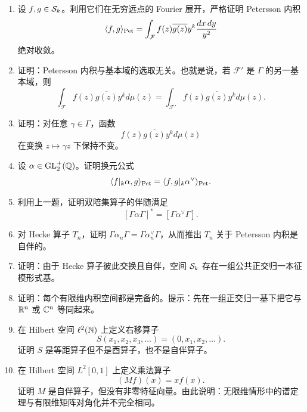 \begin{enumerate}[label=\textbf{5.\arabic*.},start=51]
  \item \hard 设 $f,g\in \mathcal{S}_k$。利用它们在无穷远点的 Fourier 展开，严格证明 Petersson 内积
  \[
  \langle f, g \rangle_{\mathrm{Pet}}=\int_{\mathcal{F}} f(z)\overline{g(z)}y^k\frac{dx\,dy}{y^2}
  \]
  绝对收敛。

  \item \hard 证明：Petersson 内积与基本域的选取无关。也就是说，若 $\mathcal{F}'$ 是 $\Gamma$ 的另一基本域，则
  \[
  \int_{\mathcal{F}} f(z)\overline{g(z)}y^k d\mu(z)
  =
  \int_{\mathcal{F}'} f(z)\overline{g(z)}y^k d\mu(z).
  \]

  \item \hard 证明：对任意 $\gamma\in\Gamma$，函数
  \[
  f(z)\overline{g(z)}y^k d\mu(z)
  \]
  在变换 $z\mapsto \gamma z$ 下保持不变。

  \item \hard 设 $\alpha\in \mathrm{GL}_2^+(\mathbb{Q})$。证明换元公式
  \[
  \langle f|_k\alpha, g \rangle_{\mathrm{Pet}}=\langle f, g|_k\alpha^{\vee} \rangle_{\mathrm{Pet}}.
  \]

  \item \hard 利用上一题，证明双陪集算子的伴随满足
  \[
  [\Gamma\alpha\Gamma]^*=[\Gamma\alpha^{\vee}\Gamma].
  \]

  \item \hard 对 Hecke 算子 $T_n$，证明 $\Gamma\alpha_n\Gamma=\Gamma\alpha_n^{\vee}\Gamma$，从而推出 $T_n$ 关于 Petersson 内积是自伴的。

  \item \hard 证明：由于 Hecke 算子彼此交换且自伴，空间 $\mathcal{S}_k$ 存在一组公共正交归一本征模形式基。

  \item \hard 证明：每个有限维内积空间都是完备的。提示：先在一组正交归一基下把它与 $\mathbb{R}^n$ 或 $\mathbb{C}^n$ 等同起来。

  \item \hard 在 Hilbert 空间 $\ell^2(\mathbb{N})$ 上定义右移算子
  \[
  S(x_1,x_2,x_3,\dots)=(0,x_1,x_2,\dots).
  \]
  证明 $S$ 是等距算子但不是酉算子，也不是自伴算子。

  \item \hard 在 Hilbert 空间 $L^2[0,1]$ 上定义乘法算子
  \[
  (Mf)(x)=xf(x).
  \]
  证明 $M$ 是自伴算子，但没有非零特征向量。由此说明：无限维情形中的谱定理与有限维矩阵对角化并不完全相同。
\end{enumerate}

